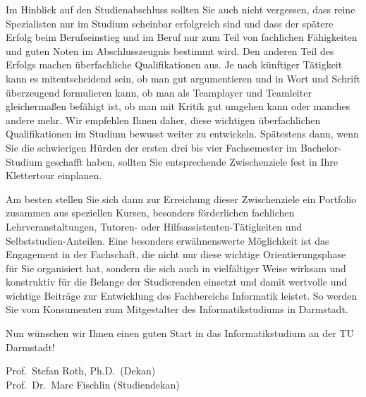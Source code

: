 {    Im Hinblick auf den Studienabschluss sollten Sie auch nicht vergessen, dass reine Spezialisten nur im Studium scheinbar erfolgreich sind und dass der spätere Erfolg beim Berufseinstieg und im Beruf nur zum Teil
    von fachlichen Fähigkeiten und guten Noten im Abschlusszeugnis bestimmt wird. Den anderen Teil des Erfolgs machen überfachliche Qualifikationen aus. Je nach künftiger Tätigkeit kann es mitentscheidend sein, ob man gut argumentieren und in Wort und Schrift überzeugend formulieren kann, ob man als Teamplayer und Teamleiter gleichermaßen befähigt ist, ob man mit Kritik gut umgehen kann oder manches andere mehr. Wir empfehlen Ihnen daher, diese wichtigen überfachlichen Qualifikationen im Studium bewusst weiter zu entwickeln. Spätestens dann, wenn Sie die schwierigen Hürden der ersten drei bis vier Fachsemester im Bachelor-Studium geschafft haben, sollten Sie entsprechende Zwischenziele fest in Ihre Klettertour einplanen.

    Am besten stellen Sie sich dann zur Erreichung dieser Zwischenziele ein Portfolio zusammen aus speziellen Kursen, besonders förderlichen fachlichen Lehrveranstaltungen, Tutoren- oder Hilfsassistenten-Tätigkeiten und Selbststudien-Anteilen. Eine besonders erwähnenswerte Möglichkeit ist das Engagement in der Fachschaft, die nicht nur diese wichtige Orientierungsphase für Sie organisiert hat, sondern die sich auch in vielfältiger Weise wirksam und konstruktiv für die Belange der Studierenden einsetzt und damit wertvolle und wichtige Beiträge zur Entwicklung des Fachbereichs Informatik leistet. So werden Sie vom Konsumenten zum Mitgestalter des Informatikstudiums in Darmstadt.

    Nun wünschen wir Ihnen einen guten Start in das Informatikstudium an der TU Darmstadt!
}
{Prof.~Stefan Roth, Ph.D.~(Dekan) \\Prof.~Dr.~Marc Fischlin (Studiendekan)}

\newpage

